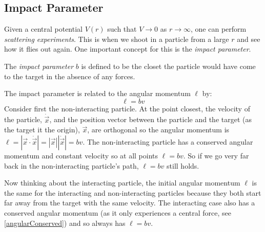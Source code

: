 \documentclass[../main.tex]{subfiles}
\begin{document}
\subsection{Impact Parameter}
Given a central potential $V(r)$ such that $V \to 0$ as $r \to \infty$, one can perform \textit{scattering experiments}.
This is when we shoot in a particle from a large $r$ and see how it flies out again.
One important concept for this is the \textit{impact parameter}.
\begin{definition}
  The \textit{impact parameter} $b$ is defined to be the closet the particle would have come to the target in the absence of any forces.
\end{definition}
\begin{center}
\end{center}
The impact parameter is related to the angular momentum $\ell$ by:
\[
  \ell = bv
\]
Consider first the non-interacting particle.
At the point closest, the velocity of the particle, $\dot{\vec{x}}$, and the position vector between the particle and the target (as the target it the origin), $\vec{x}$, are orthogonal so the angular momentum is $\ell = |\vec{x} \cdot \dot{\vec{x}}| = |\vec{x}| |\dot{\vec{x}}| = bv$.
The non-interacting particle has a conserved angular momentum and constant velocity so at all points $\ell = bv$.
So if we go very far back in the non-interacting particle's path, $\ell = bv$ still holds.

Now thinking about the interacting particle, the initial angular momentum $\ell$ is the same for the interacting and non-interacting particles because they both start far away from the target with the same velocity.
The interacting case also has a conserved angular momentum (as it only experiences a central force, see \cref{angularConserved}) and so always has $\ell = bv$.
\end{document}
